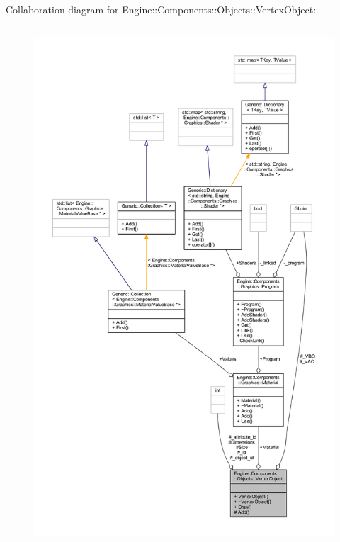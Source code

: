 Collaboration diagram for Engine\+:\+:Components\+:\+:Objects\+:\+:Vertex\+Object\+:
\nopagebreak
\begin{figure}[H]
\begin{center}
\leavevmode
\includegraphics[height=550pt]{classEngine_1_1Components_1_1Objects_1_1VertexObject__coll__graph}
\end{center}
\end{figure}

